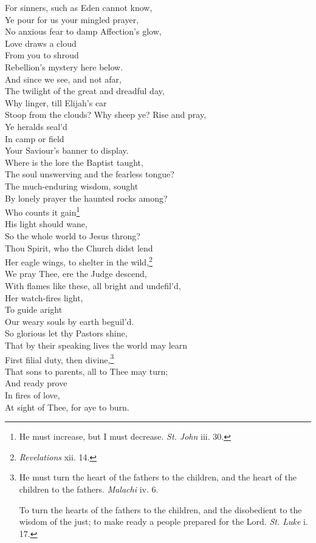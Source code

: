  For sinners, such as Eden cannot know, \\
 Ye pour for us your mingled prayer, \\
 No anxious fear to damp Affection’s glow, \\
 Love draws a cloud \\
 From you to shroud \\
 Rebellion’s mystery here below. \\
  And since we see, and not afar, \\
 The twilight of the great and dreadful day, \\
 Why linger, till Elijah’s car \\
 Stoop from the clouds? Why sheep ye? Rise and pray, \\
 Ye heralds seal’d \\
 In camp or field \\
 Your Saviour’s banner to display. \\
  Where is the lore the Baptist taught, \\
 The soul unswerving and the fearless tongue? \\
 The much-enduring wisdom, sought \\
 By lonely prayer the haunted rocks among? \\
 Who counts it gain\footnote{He must increase, but I must decrease. \emph{St. John} iii. 30.} \\
 His light should wane, \\
 So the whole world to Jesus throng? \\
  Thou Spirit, who the Church didst lend \\
 Her eagle wings, to shelter in the wild,\footnote{\emph{Revelations} xii. 14.} \\
 We pray Thee, ere the Judge descend, \\
 With flames like these, all bright and undefil’d, \\
 Her watch-fires light, \\
 To guide aright \\
 Our weary souls by earth beguil’d. \\
  So glorious let thy Pastors shine, \\
 That by their speaking lives the world may learn \\
 First filial duty, then divine,\footnote{He must turn the heart of the fathers to the children, and the heart of the children to the fathers. \emph{Malachi} iv. 6. \par To turn the hearts of the fathers to the children, and the disobedient to the wisdom of the just; to make ready a people prepared for the Lord. \emph{St. Luke} i. 17.} \\
 That sons to parents, all to Thee may turn; \\
 And ready prove \\
 In fires of love, \\
 At sight of Thee, for aye to burn.\\

